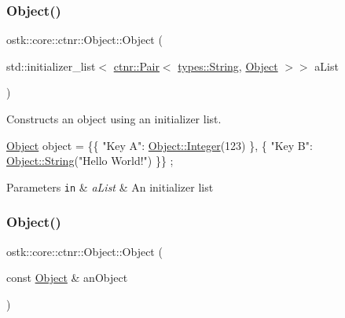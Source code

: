 \subsubsection{\texorpdfstring{Object()}{Object()}\hspace{0.1cm}{\footnotesize\ttfamily [2/3]}}
{\footnotesize\ttfamily ostk\+::core\+::ctnr\+::\+Object\+::\+Object (\begin{DoxyParamCaption}\item[{std\+::initializer\+\_\+list$<$ \hyperlink{namespaceostk_1_1core_1_1ctnr_a08e64f04352e3c432bff0cfd3b23923b}{ctnr\+::\+Pair}$<$ \hyperlink{classostk_1_1core_1_1types_1_1_string}{types\+::\+String}, \hyperlink{classostk_1_1core_1_1ctnr_1_1_object}{Object} $>$$>$}]{a\+List }\end{DoxyParamCaption})}



Constructs an object using an initializer list. 


\begin{DoxyCode}
\hyperlink{classostk_1_1core_1_1ctnr_1_1_object_a8e5ab6d15d9e28f3e2c65572f22aeb74}{Object} \textcolor{keywordtype}{object} = \{\{ \textcolor{stringliteral}{"Key A"}: \hyperlink{classostk_1_1core_1_1ctnr_1_1_object_af3bef3ae331e8e55662bf91a4cd5026f}{Object::Integer}(123) \}, \{ \textcolor{stringliteral}{"Key B"}: 
      \hyperlink{classostk_1_1core_1_1ctnr_1_1_object_aab792cff0163e7cd57c49afe36eea380}{Object::String}(\textcolor{stringliteral}{"Hello World!"}) \}\} ;
\end{DoxyCode}



\begin{DoxyParams}[1]{Parameters}
\mbox{\tt in}  & {\em a\+List} & An initializer list \\
\hline
\end{DoxyParams}
\mbox{\label{classostk_1_1core_1_1ctnr_1_1_object_a1d2f5d239649fce130631e7b592d5ec2}} 
\subsubsection{\texorpdfstring{Object()}{Object()}\hspace{0.1cm}{\footnotesize\ttfamily [3/3]}}
{\footnotesize\ttfamily ostk\+::core\+::ctnr\+::\+Object\+::\+Object (\begin{DoxyParamCaption}\item[{const \hyperlink{classostk_1_1core_1_1ctnr_1_1_object}{Object} \&}]{an\+Object }\end{DoxyParamCaption})}



